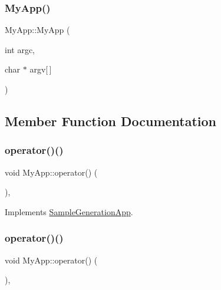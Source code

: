 \mbox{\label{class_my_app_a2cedcf8942b99702d5e26db7d07ff57b}} 
\subsubsection{\texorpdfstring{My\+App()}{MyApp()}\hspace{0.1cm}{\footnotesize\ttfamily [8/8]}}
{\footnotesize\ttfamily My\+App\+::\+My\+App (\begin{DoxyParamCaption}\item[{int}]{argc,  }\item[{char $\ast$}]{argv\mbox{[}$\,$\mbox{]} }\end{DoxyParamCaption})\hspace{0.3cm}{\ttfamily [inline]}}



\subsection{Member Function Documentation}
\mbox{\label{class_my_app_a376d7e3ddb7ab21223f29a7263b6fb14}} 
\subsubsection{\texorpdfstring{operator()()}{operator()()}\hspace{0.1cm}{\footnotesize\ttfamily [1/8]}}
{\footnotesize\ttfamily void My\+App\+::operator() (\begin{DoxyParamCaption}{ }\end{DoxyParamCaption})\hspace{0.3cm}{\ttfamily [inline]}, {\ttfamily [virtual]}}



Implements \hyperlink{class_sample_generation_app_a351fe6cfe624aeeee9ba4fb04d80ca0f}{Sample\+Generation\+App}.

\mbox{\label{class_my_app_a376d7e3ddb7ab21223f29a7263b6fb14}} 
\subsubsection{\texorpdfstring{operator()()}{operator()()}\hspace{0.1cm}{\footnotesize\ttfamily [2/8]}}
{\footnotesize\ttfamily void My\+App\+::operator() (\begin{DoxyParamCaption}{ }\end{DoxyParamCaption})\hspace{0.3cm}{\ttfamily [inline]}, {\ttfamily [virtual]}}



